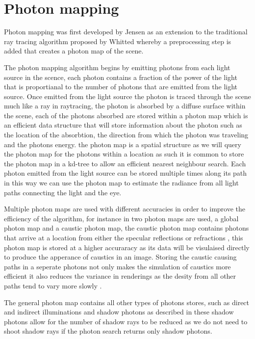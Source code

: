 \section{Photon mapping}
Photon mapping was first developed by Jensen \cite{Jensen95b} as an extension to the traditional ray
tracing algorithm proposed by Whitted \cite{whitted79a} whereby a preprocessing step is added that
creates a photon map of the scene.

The photon mapping algorithm begins by emitting photons from each light source in the scence,
each photon contains a fraction of the power of the light that is proportianal to the number
of photons that are emitted from the light source. Once emitted from the light source the
photon is traced through the scene much like a ray in raytracing, 
the photon is absorbed by a diffuse surface within the scene, each of the photons absorbed are stored within a photon map
which is an efficient data structure that will store information about the photon such as the
location of the absorbtion, the direction from which the photon was traveling and the photons
energy. the photon map is a spatial structure as we will query the photon map for the photons
within a location as such it is common to store the photon map in a kd-tree to allow an efficient
nearest neighbour search. Each photon emitted from the light source can be stored multiple times
along its path in this way we can use the photon map to estimate the radiance from all light
paths connecting the light and the eye.

Multiple photon maps are used with different accuracies in order to
improve the efficiency of the algorithm, for instance in \cite{Jensen96a} two photon maps are used, a global photon
map and a caustic photon map, the caustic photon map contains photons that arrive at a location from
either the specular reflections or refractions , this photon map is stored at a higher
accuraracy as its data will be visulaised directly to produce the apperance of caustics in an image.
Storing the caustic causing paths in a seperate photons not only makes the simulation of caustics
more efficient it also reduces the variance in renderings as the desity from all other paths
tend to vary more slowly \cite{JensenBook}.

The general photon map contains all other types of photons stores, such as direct and indirect
illuminations and shadow photons as described in \cite{Jensen95c, Jensen96a} these shadow photons
allow for the number of shadow rays to be reduced as we do not need to shoot shadow rays if the
photon search returns only shadow photons.

